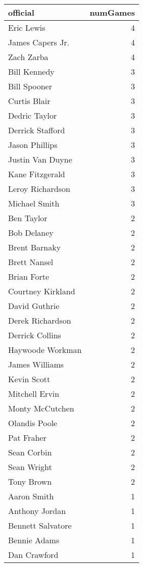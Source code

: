 \begingroup\fontsize{7pt}{7pt}\selectfont
\begin{longtable}{lr}
  \hline
official & numGames \\ 
  \hline
Eric Lewis &   4 \\ 
  James Capers Jr. &   4 \\ 
  Zach Zarba &   4 \\ 
  Bill Kennedy &   3 \\ 
  Bill Spooner &   3 \\ 
  Curtis Blair &   3 \\ 
  Dedric Taylor &   3 \\ 
  Derrick Stafford &   3 \\ 
  Jason Phillips &   3 \\ 
  Justin Van Duyne &   3 \\ 
  Kane Fitzgerald &   3 \\ 
  Leroy Richardson &   3 \\ 
  Michael Smith &   3 \\ 
  Ben Taylor &   2 \\ 
  Bob Delaney &   2 \\ 
  Brent Barnaky &   2 \\ 
  Brett Nansel &   2 \\ 
  Brian Forte &   2 \\ 
  Courtney Kirkland &   2 \\ 
  David Guthrie &   2 \\ 
  Derek Richardson &   2 \\ 
  Derrick Collins &   2 \\ 
  Haywoode Workman &   2 \\ 
  James Williams &   2 \\ 
  Kevin Scott &   2 \\ 
  Mitchell Ervin &   2 \\ 
  Monty McCutchen &   2 \\ 
  Olandis Poole &   2 \\ 
  Pat Fraher &   2 \\ 
  Sean Corbin &   2 \\ 
  Sean Wright &   2 \\ 
  Tony Brown &   2 \\ 
  Aaron Smith &   1 \\ 
  Anthony Jordan &   1 \\ 
  Bennett Salvatore &   1 \\ 
  Bennie Adams &   1 \\ 
  Dan Crawford &   1 \\ 

\end{longtable}
